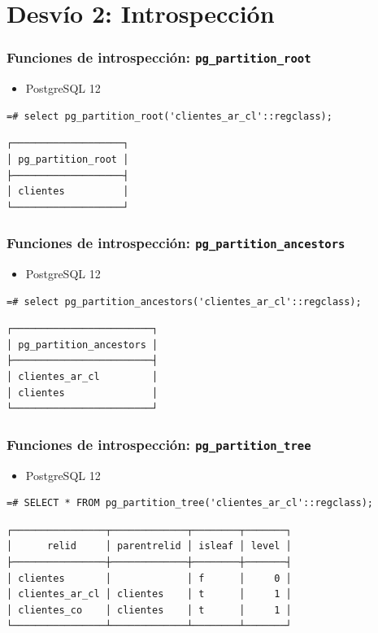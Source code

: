 \documentclass[ignorenonframetext,t]{beamer}
\begin{document}
\section{Desvío 2: Introspección}
\begin{frame}[fragile]
	\frametitle{Funciones de introspección: \texttt{pg\_partition\_root}}

\begin{itemize} \item PostgreSQL 12 \end{itemize}

\begin{lstlisting}
=# select pg_partition_root('clientes_ar_cl'::regclass);
\end{lstlisting}
\small
\begin{verbatim}
┌───────────────────┐
│ pg_partition_root │
├───────────────────┤
│ clientes          │
└───────────────────┘
\end{verbatim}
\end{frame}

\begin{frame}[fragile]
	\frametitle{Funciones de introspección: \texttt{pg\_partition\_ancestors}}

\begin{itemize} \item PostgreSQL 12 \end{itemize}

\begin{lstlisting}
=# select pg_partition_ancestors('clientes_ar_cl'::regclass);
\end{lstlisting}
\small
\begin{verbatim}
┌────────────────────────┐
│ pg_partition_ancestors │
├────────────────────────┤
│ clientes_ar_cl         │
│ clientes               │
└────────────────────────┘
\end{verbatim}

\end{frame}

\begin{frame}[fragile]
	\frametitle{Funciones de introspección: \texttt{pg\_partition\_tree}}

\begin{itemize} \item PostgreSQL 12 \end{itemize}

\begin{lstlisting}
=# SELECT * FROM pg_partition_tree('clientes_ar_cl'::regclass);
\end{lstlisting}
\small
\begin{verbatim}
┌────────────────┬─────────────┬────────┬───────┐
│      relid     │ parentrelid │ isleaf │ level │
├────────────────┼─────────────┼────────┼───────┤
│ clientes       │             │ f      │     0 │
│ clientes_ar_cl │ clientes    │ t      │     1 │
│ clientes_co    │ clientes    │ t      │     1 │
└────────────────┴─────────────┴────────┴───────┘
\end{verbatim}
\end{frame}
\end{document}
